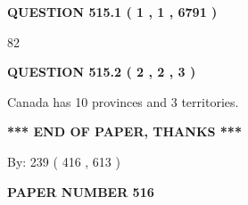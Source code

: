 \documentclass[12pt]{article}
\begin{document}
   
   
   
 \vspace{0.2in}
 
 
 
 
   
   
  
\vspace{0.2in}
  
{\textbf{\Large{QUESTION
515.1 
 ( 1 , 1 , 6791 )
}}}
  
  
 
 
\noindent{}

82
 
 
  
\vspace{0.2in}
  
{\textbf{\Large{QUESTION
515.2 
 ( 2 , 2 , 3 )
}}}
  
  
 
 
\noindent{}
 
 
Canada has 10  provinces and 3 territories.
 
 
 
 
   
   
 \vspace{0.2in}
 
   
   
   
   
\vspace{1.0in} 
{\textbf{\large{ *** END OF PAPER, THANKS *** }}} 
   
   
\hspace{1.0in} By: 
 239 ( 416 ,  613 )
   
   
   
   
\newpage 
\setcounter{page}{ 
   516001 } 
   
   
   
   
 {\textbf{ \Large{ PAPER NUMBER  516  }}}
   
   
\vspace{0.2in}
   
   
   
   
   
   
 \vspace{0.2in}
 
 
 
 
   
\end{document}
